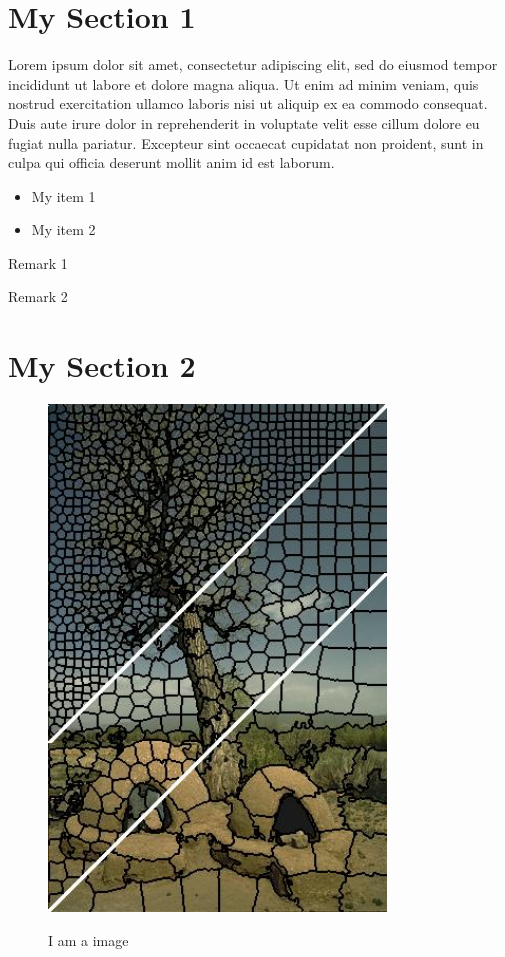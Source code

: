 \documentclass[11pt,fleqn,openany]{book} %
\begin{document}
\section{My Section 1}
Lorem ipsum dolor sit amet, consectetur adipiscing elit, sed do eiusmod tempor incididunt ut labore et dolore magna aliqua. Ut enim ad minim veniam, quis nostrud exercitation ullamco laboris nisi ut aliquip ex ea commodo consequat. Duis aute irure dolor in reprehenderit in voluptate velit esse cillum dolore eu fugiat nulla pariatur. Excepteur sint occaecat cupidatat non proident, sunt in culpa qui officia deserunt mollit anim id est laborum.

\begin{itemize}
  \item My item 1
  \item My item 2
\end{itemize}

\begin{remark}
Remark 1
\end{remark}

\begin{remark}
Remark 2
\end{remark}

\section{My Section 2}
\begin{figure}[!htb]
\centering
\includegraphics[width=0.8\textwidth]{Pictures/combo.jpg}
\label{afigure}
\caption{I am a image}
\end{figure}
\end{document}
